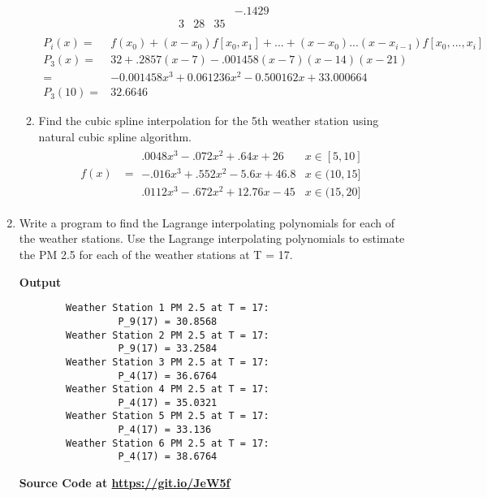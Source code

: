 \documentclass{exam}
\begin{document}
\begin{enumerate}
\begin{enumerate}
\begin{equation*}
\begin{array}{cccccc}
                  &     &       & -.1429\\
                3 & 28  & 35\\
            \end{array}
        \end{equation*}
        \begin{align*}
            P_i(x)=&f(x_0)+(x-x_0)f[x_0,x_1]+...+(x-x_0)...(x-x_{i-1})f[x_0,...,x_i]\\
            P_3(x)=&32 + .2857(x-7) - .001458(x-7)(x-14)(x-21)\\
            =&-0.001458x^3+0.061236x^2-0.500162x+33.000664\\
            P_3(10)=&\mathbf{32.6646}
        \end{align*}
        \newpage
        \item Find the cubic spline interpolation for the 5th weather station using natural cubic spline algorithm.
		\begin{align*}
			f(x) &= 
			\begin{array}{ll}
			.0048x^3-.072x^2+.64x+26 	& x \in [5,10]\\
			-.016x^3+.552x^2-5.6x+46.8	& x \in (10,15]\\
			.0112x^3-.672x^2+12.76x-45	& x \in (15,20]	
			\end{array}
		\end{align*}
    \end{enumerate}
    \item  Write a program to find the Lagrange interpolating polynomials for each of the weather stations. Use the Lagrange interpolating polynomials to estimate the PM 2.5 for each of the weather stations at T = 17.
    \begin{center}
        \textbf{Output}
    \end{center}
    \begin{verbatim}
        Weather Station 1 PM 2.5 at T = 17:
                 P_9(17) = 30.8568
        Weather Station 2 PM 2.5 at T = 17:
                 P_9(17) = 33.2584
        Weather Station 3 PM 2.5 at T = 17:
                 P_4(17) = 36.6764
        Weather Station 4 PM 2.5 at T = 17:
                 P_4(17) = 35.0321
        Weather Station 5 PM 2.5 at T = 17:
                 P_4(17) = 33.136
        Weather Station 6 PM 2.5 at T = 17:
                 P_4(17) = 38.6764
    \end{verbatim}
    \begin{center}
        \textbf{Source Code at \url{https://git.io/JeW5f}}
    \end{center}

\end{enumerate}
\end{document}
